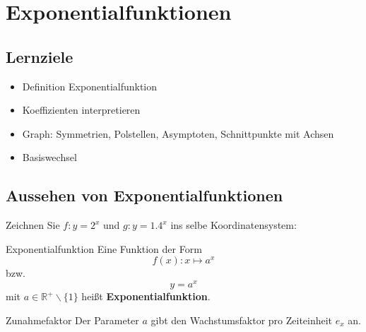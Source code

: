 
\section{Exponentialfunktionen}
\subsection*{Lernziele}

\begin{itemize}
\item Definition Exponentialfunktion
\item Koeffizienten interpretieren
\item Graph: Symmetrien, Polstellen, Asymptoten, Schnittpunkte mit
  Achsen
  \item Basiswechsel
\end{itemize}

\newpage

\subsection{Aussehen von Exponentialfunktionen}


Zeichnen Sie $f: y=2^x$ und $g: y=1.4^x$ ins selbe Koordinatensystem:



\begin{definition}{Exponentialfunktion}{}
  Eine Funktion der Form $$f(x): x \mapsto a^x$$
  bzw. $$y = a^x$$
  mit $a\in \mathbb{R}^{+}\backslash\{1\}$ heißt \textbf{Exponentialfunktion}.
\end{definition}


\begin{bemerkung}{Zunahmefaktor}{}
Der Parameter $a$ gibt den Wachstumsfaktor pro Zeiteinheit $e_x$ an.
\end{bemerkung}

\newpage

